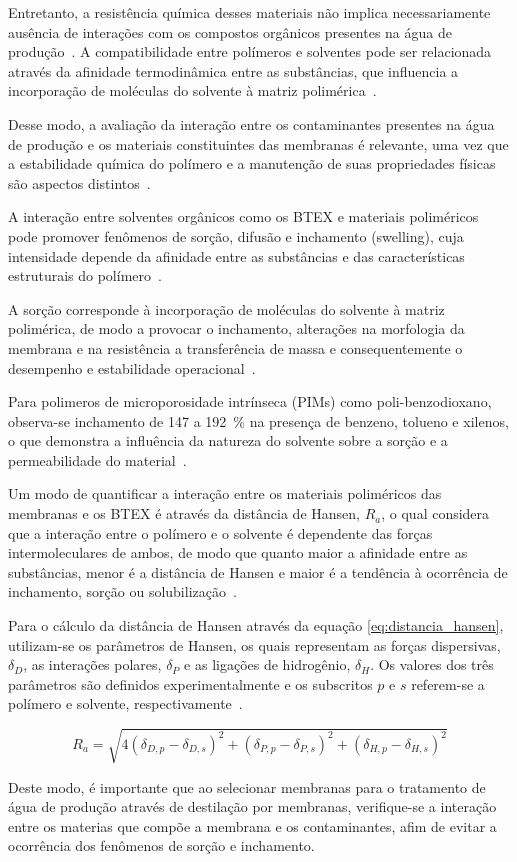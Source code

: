 Entretanto, a resistência química desses materiais não implica necessariamente ausência de interações com os compostos orgânicos presentes na água de produção~\cite{Kass2017Hansen}. A compatibilidade entre polímeros e solventes pode ser relacionada através da afinidade termodinâmica entre as substâncias, que influencia a incorporação de moléculas do solvente à matriz polimérica~\cite{Yushkin2018Hansen,Hansen2000}.

Desse modo, a avaliação da interação entre os contaminantes presentes na água de produção e os materiais constituintes das membranas é relevante, uma vez que a estabilidade química do polímero e a manutenção de suas propriedades físicas são aspectos distintos~\cite{Hansen2000}.

A interação entre solventes orgânicos como os BTEX e materiais poliméricos pode promover fenômenos de sorção, difusão e inchamento (swelling), cuja intensidade depende da afinidade entre as substâncias e das características estruturais do polímero~\cite{Hansen2000,Yushkin2018Hansen,Kass2017Hansen}.

A sorção corresponde à incorporação de moléculas do solvente à matriz polimérica, de modo a provocar o inchamento, alterações na morfologia da membrana e na resistência a transferência de massa e consequentemente o desempenho e estabilidade operacional~\cite{Hansen2000,Yushkin2018Hansen,Kass2017Hansen}.

Para polimeros de microporosidade intrínseca (PIMs) como poli-benzodioxano, observa-se inchamento de 147 a 192~\% na presença de benzeno, tolueno e xilenos, o que demonstra a influência da natureza do solvente sobre a sorção e a permeabilidade do material~\cite{Yushkin2018Hansen}. 
 
Um modo de quantificar a interação entre os materiais poliméricos das membranas e os BTEX é através da distância de Hansen, $R_a$, o qual considera que a interação entre o polímero e o solvente é dependente das forças intermoleculares de ambos, de modo que quanto maior a afinidade entre as substâncias, menor é a distância de Hansen e maior é a tendência à ocorrência de inchamento, sorção ou solubilização~\cite{Hansen2000}.

Para o cálculo da distância de Hansen através da equação \ref{eq:distancia_hansen}, utilizam-se os parâmetros de Hansen, os quais representam as forças dispersivas, $\delta_D$, as interações polares, $\delta_P$ e as ligações de hidrogênio, $\delta_H$. Os valores dos três parâmetros são definidos experimentalmente e os subscritos $p$ e $s$ referem-se a polímero e solvente, respectivamente~\cite{Hansen2000}.

\begin{equation}
    R_a = \sqrt{
        4(\delta_{D,p} - \delta_{D,s})^2
        + (\delta_{P,p} - \delta_{P,s})^2
        + (\delta_{H,p} - \delta_{H,s})^2
    }
    \label{eq:distancia_hansen}
\end{equation}

Deste modo, é importante que ao selecionar membranas para o tratamento de água de produção através de destilação por membranas, verifique-se a interação entre os materias que compõe a membrana e os contaminantes, afim de evitar a ocorrência dos fenômenos de sorção e inchamento.
